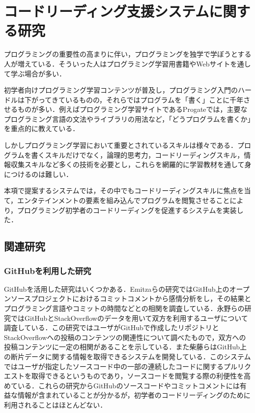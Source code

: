 \section{コードリーディング支援システムに関する研究}


プログラミングの重要性の高まりに伴い，プログラミングを独学で学ぼうとする人が増えている．そういった人はプログラミング学習用書籍やWebサイトを通して学ぶ場合が多い．

初学者向けプログラミング学習コンテンツが普及し，プログラミング入門のハードルは下がってきているものの，それらではプログラムを「書く」ことに千年させるものが多い．例えばプログラミング学習サイトであるProgate\cite{progate}では，主要なプログラミング言語の文法やライブラリの用法など，「どうプログラムを書くか」を重点的に教えている．

しかしプログラミング学習において重要とされているスキルは様々である．プログラムを書くスキルだけでなく，論理的思考力，コードリーディングスキル，情報収集スキルなど多くの技術を必要とし，これらを網羅的に学習教材を通して身につけるのは難しい．

本項で提案するシステムでは，その中でもコードリーディングスキルに焦点を当て，エンタテインメントの要素を組み込んでプログラムを閲覧させることにより，プログラミング初学者のコードリーディングを促進するシステムを実装した．
\subsection{関連研究}

\subsubsection{GitHubを利用した研究}
GitHubを活用した研究はいくつかある．Emitzaらの研究\cite{guzman}ではGitHub上のオープンソースプロジェクトにおけるコミットコメントから感情分析をし，その結果とプログラミング言語やコミットの時間などとの相関を調査している．永野らの研究\cite{nagano}ではGitHubとStackOverflowのデータを用いて双方を利用するユーザについて調査している．この研究ではユーザがGitHubで作成したリポジトリとStackOverflowへの投稿のコンテンツの関連性について調べたもので，双方への投稿コンテンツに一定の相関があることを示している．また柴藤らはGitHub上の断片データに関する情報を取得できるシステムを開発している\cite{shibatou}．このシステムではユーザが指定したソースコード中の一部の連続したコードに関するプルリクエストを取得できるというものであり，ソースコードを閲覧する際の利便性を高めている．これらの研究からGitHubのソースコードやコミットコメントには有益な情報が含まれていることが分かるが，初学者のコードリーディングのために利用されることはほとんどない．

